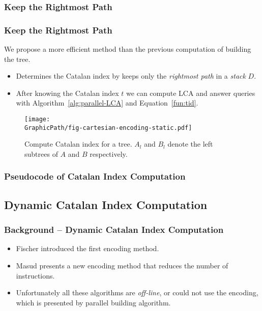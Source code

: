\subsubsection{Keep the Rightmost Path}
\begin{frame}
	\frametitle{Keep the Rightmost Path}
	We propose a more efficient method than the previous computation of
	building the tree.

	\begin{itemize}
		\setlength\itemsep{1em}
		\item 
			Determines the Catalan index by keeps only the {\em
			rightmost path} in a {\em stack} $D$.
		\item
			After knowing the Catalan index $t$ we can compute LCA and
			answer queries with Algorithm~\ref{alg:parallel-LCA} and
			Equation~\ref{fun:tid}.
	\end{itemize}
	\begin{center}
		\scalebox{0.8} { \begin{minipage}{0.8\textwidth}
			\begin{figure}[!thb]
			  \centering
			  \texttt{[image: \\GraphicPath/fig-cartesian-encoding-static.pdf]}
			  \caption{Compute Catalan index for a tree.  $A_l$ and $B_l$ denote
			    the left subtrees of $A$ and $B$ respectively.}
			  \label{fig:fig-cartesian-encoding-static}
			\end{figure}
			\end{minipage}
		}
	\end{center}
\end{frame}

\begin{withoutheadline}
\begin{frame}
	\frametitle{Pseudocode of Catalan Index Computation}
	\begin{center}
		\scalebox{0.7} { \begin{minipage}{\textwidth}
			
			\end{minipage}
		}
	\end{center}
\end{frame}
\end{withoutheadline}

\subsection{Dynamic Catalan Index Computation}
\begin{frame}
	\frametitle{Background -- Dynamic Catalan Index Computation}
	\begin{itemize}
		\setlength\itemsep{1em}
	 	\item 
	 		Fischer introduced the first encoding method.
		\item
			Masud presents a new encoding method that reduces the number
			of instructions.
		\item 
			Unfortunately all these algorithms are {\em off-line}, or
			could not use the encoding, which is presented by parallel
			building algorithm.
	\end{itemize}
\end{frame}


